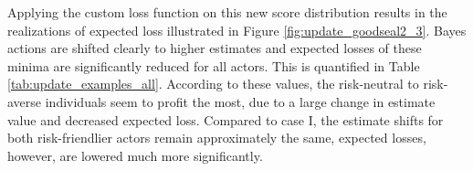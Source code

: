 				Applying the custom loss function on this new score distribution results in the realizations of expected loss illustrated in Figure \ref{fig:update_goodseal2_3}. Bayes actions are shifted clearly to higher estimates and expected losses of these minima are significantly reduced for all actors. This is quantified in Table \ref{tab:update_examples_all}. According to these values, the risk-neutral to risk-averse individuals seem to profit the most, due to a large change in estimate value and decreased expected loss. Compared to case I, the estimate shifts for both risk-friendlier actors remain approximately the same, expected losses, however, are lowered much more significantly.\\		
				
